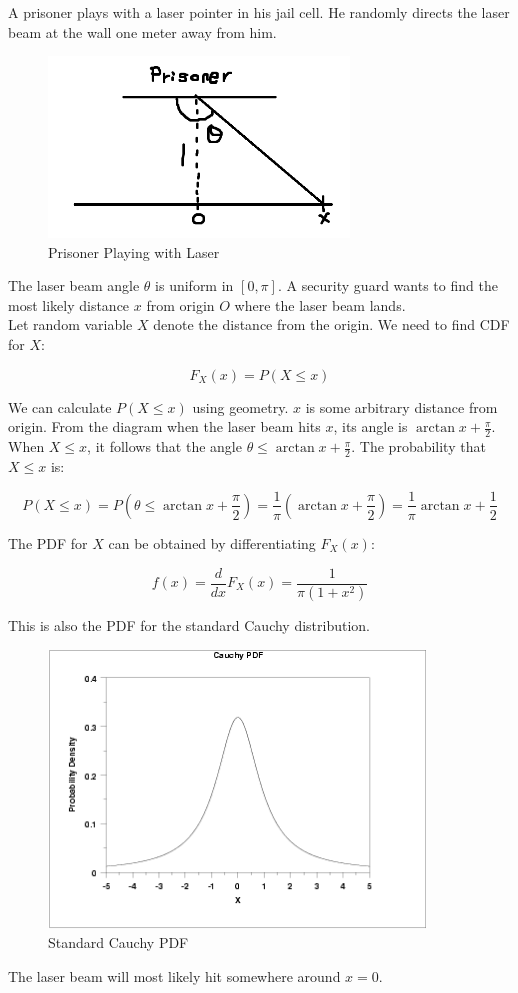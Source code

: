 \documentclass[12pt, a4paper]{article}
\newcounter{exa}
\begin{document}
\begin{texample}
A prisoner plays with a laser pointer in his jail cell. He randomly directs the laser beam at the wall one meter away from him.

\begin{figure}[H]
\centering
\includegraphics[width=80mm]{18.png}
\caption{Prisoner Playing with Laser}
\end{figure}

The laser beam angle $\theta$ is uniform in $[0, \pi]$. A security guard wants to find the most likely distance $x$ from origin $O$ where the laser beam lands. \\

Let random variable $X$ denote the distance from the origin. We need to find CDF for $X$:

$$F_X(x)=P(X\le x)$$

We can calculate $P(X\le x)$ using geometry. $x$ is some arbitrary distance from origin. From the diagram when the laser beam hits $x$, its angle is $\arctan x+\frac{\pi}{2}$. When $X\le x$, it follows that the angle $\theta \le \arctan x+\frac{\pi}{2}$. The probability that $X\le x$ is:

$$P(X\le x)=P(\theta \le \arctan x+\frac{\pi}{2})=\frac{1}{\pi}\left( \arctan x+\frac{\pi}{2} \right)=\frac{1}{\pi}\arctan x+\frac12$$

The PDF for $X$ can be obtained by differentiating $F_X(x)$:

$$f(x)=\frac{d}{dx}F_X(x)=\frac{1}{\pi (1+x^2)}$$

This is also the PDF for the standard Cauchy distribution.

\begin{figure}[H]
\centering
\includegraphics[width=100mm]{19.png}
\caption{Standard Cauchy PDF}
\end{figure}

The laser beam will most likely hit somewhere around $x=0$.
\end{texample}
\end{document}
